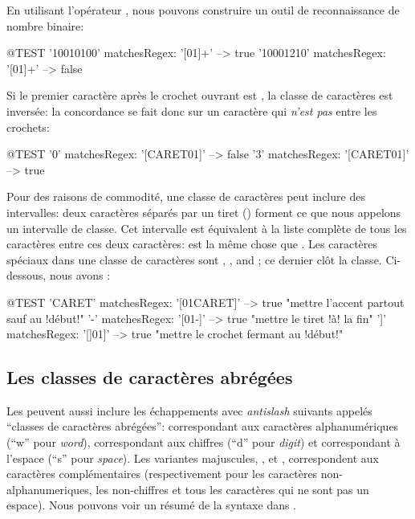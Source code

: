 \documentclass[a4paper,10pt,twoside]{book}
\begin{document}
{En utilisant l'opérateur \ct{+}, nous pouvons construire un outil de
reconnaissance de nombre binaire:
\begin{code}{@TEST}
'10010100' matchesRegex: '[01]+' --> true
'10001210' matchesRegex: '[01]+' --> false
\end{code}

Si le premier caractère après le crochet ouvrant est ,
la classe de caractères est inversée: la concordance se fait donc sur
un caractère qui \emph{n'est pas} entre les crochets:
\begin{code}{@TEST}
'0' matchesRegex: '[CARET01]' --> false
'3' matchesRegex: '[CARET01]' --> true
\end{code}

Pour des raisons de commodité, une classe de caractères peut inclure
des intervalles: deux caractères séparés par un tiret (\ct{-})
forment ce que nous appelons un intervalle de classe.
Cet intervalle est équivalent à la liste complète de tous les
caractères entre ces deux caractères:   est la même chose
que  .
Les caractères spéciaux dans une classe de caractères sont 
, \ct{-}, and \ct{]}; ce dernier clôt la classe. 
Ci-dessous, nous avons :
\begin{code}{@TEST}
'CARET' matchesRegex: '[01CARET]'   --> true    "mettre l'accent partout sauf au !début!"
'-' matchesRegex: '[01-]' --> true    "mettre le tiret !à! la fin"
']' matchesRegex: '[]01]'   --> true    "mettre le crochet fermant au
!début!"
\end{code}


\subsection{Les classes de caractères abrégées}
Les \expregs{} peuvent aussi inclure les échappements avec
\emph{antislash} suivants appelés ``classes de caractères abrégées'':
\ct{\w} correspondant aux caractères alphanumériques (``w'' pour
\emph{word}), \ct{\d} correspondant aux chiffres (``d'' pour
\emph{digit}) et \ct{\s} correspondant à l'espace (``s'' pour
\emph{space}).
Les variantes majuscules, \ct{\W}, \ct{\D} et \ct{\S}, correspondent
aux caractères complémentaires (respectivement pour les caractères
non-alphanumeriques, les non-chiffres et tous les caractères qui ne
sont pas un espace).
Nous pouvons voir un résumé de la syntaxe \pkgregex dans
.

}
\end{document}
